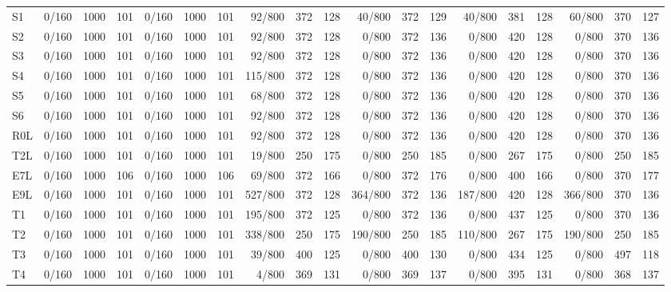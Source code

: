\begin{table}[!htbp]
\begin{tabular}{@{}lrrrrrrrrrrrrrrrrrr@{}}
S1 & 0/160 & 1000 & 101 & 0/160 & 1000 & 101 & 92/800 & 372 & 128 & 40/800 & 372 & 129 & 40/800 & 381 & 128 & 60/800 & 370 & 127\\
S2 & 0/160 & 1000 & 101 & 0/160 & 1000 & 101 & 92/800 & 372 & 128 & 0/800 & 372 & 136 & 0/800 & 420 & 128 & 0/800 & 370 & 136\\
S3 & 0/160 & 1000 & 101 & 0/160 & 1000 & 101 & 92/800 & 372 & 128 & 0/800 & 372 & 136 & 0/800 & 420 & 128 & 0/800 & 370 & 136\\
S4 & 0/160 & 1000 & 101 & 0/160 & 1000 & 101 & 115/800 & 372 & 128 & 0/800 & 372 & 136 & 0/800 & 420 & 128 & 0/800 & 370 & 136\\
S5 & 0/160 & 1000 & 101 & 0/160 & 1000 & 101 & 68/800 & 372 & 128 & 0/800 & 372 & 136 & 0/800 & 420 & 128 & 0/800 & 370 & 136\\
S6 & 0/160 & 1000 & 101 & 0/160 & 1000 & 101 & 92/800 & 372 & 128 & 0/800 & 372 & 136 & 0/800 & 420 & 128 & 0/800 & 370 & 136\\
R0L & 0/160 & 1000 & 101 & 0/160 & 1000 & 101 & 92/800 & 372 & 128 & 0/800 & 372 & 136 & 0/800 & 420 & 128 & 0/800 & 370 & 136\\
T2L & 0/160 & 1000 & 101 & 0/160 & 1000 & 101 & 19/800 & 250 & 175 & 0/800 & 250 & 185 & 0/800 & 267 & 175 & 0/800 & 250 & 185\\
E7L & 0/160 & 1000 & 106 & 0/160 & 1000 & 106 & 69/800 & 372 & 166 & 0/800 & 372 & 176 & 0/800 & 400 & 166 & 0/800 & 370 & 177\\
E9L & 0/160 & 1000 & 101 & 0/160 & 1000 & 101 & 527/800 & 372 & 128 & 364/800 & 372 & 136 & 187/800 & 420 & 128 & 366/800 & 370 & 136\\
T1 & 0/160 & 1000 & 101 & 0/160 & 1000 & 101 & 195/800 & 372 & 125 & 0/800 & 372 & 136 & 0/800 & 437 & 125 & 0/800 & 370 & 136\\
T2 & 0/160 & 1000 & 101 & 0/160 & 1000 & 101 & 338/800 & 250 & 175 & 190/800 & 250 & 185 & 110/800 & 267 & 175 & 190/800 & 250 & 185\\
T3 & 0/160 & 1000 & 101 & 0/160 & 1000 & 101 & 39/800 & 400 & 125 & 0/800 & 400 & 130 & 0/800 & 434 & 125 & 0/800 & 497 & 118\\
T4 & 0/160 & 1000 & 101 & 0/160 & 1000 & 101 & 4/800 & 369 & 131 & 0/800 & 369 & 137 & 0/800 & 395 & 131 & 0/800 & 368 & 137\\
\bottomrule\end{tabular}\end{table}